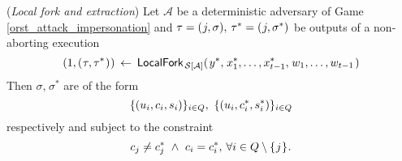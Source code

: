 \documentclass{iacrtrans}
\begin{document}
\begin{prop}\label{orst_extractability_prop}
\textup{(\textit{Local fork and extraction})}
Let $\mathcal{A}$ be a deterministic adversary of
Game \textup{\ref{orst_attack_impersonation}}
and
$\tau = (\hspace{0.5pt}j, \sigma),
\hspace{2pt}\tau^* = (\hspace{0.5pt}j, \sigma^*)$
be outputs of a non-aborting execution
\vspace{5pt}
\begin{equation*}
(
	\vspace{1pt}
	1,
	\vspace{1pt}
	(
		\hspace{0.5pt}
		\tau,
		\tau^*
		\hspace{0.5pt}
	)
	\hspace{0.5pt}
)
\hspace{2pt}
\leftarrow
\hspace{2pt}
\mathsf{LocalFork}_{
		\hspace{1pt}
    	\mathcal{S}\hspace{0pt}[
    		\hspace{0pt}
    		\mathcal{A}
    		\hspace{0pt}
    	]
    }
	(
   		\hspace{1pt}
		y ^*,
		\hspace{1pt}
		x_1^*, \dots, x_{t-1}^*,
		\hspace{1pt}
		w_1, \dots, w_{t-1}
		\hspace{1pt}
   	)
\vspace{5pt}
\end{equation*}
Then $\sigma,\hspace{1pt}\sigma^*$ are of the form
\vspace{5pt}
\begin{equation}\label{orst_forked_proofs}
\{(u_i, c_i, s_i)\}_{i \in Q},\ \{(u_i, c_i^*, s_i^*)\}_{i \in Q}
\vspace{5pt}
\end{equation}
respectively and subject to the constraint
\vspace{5pt}
\begin{equation}\label{orst_forked_challenges}
c_j \neq c_j^*
\ \land
\ c_i = c_i^*,\hspace{2pt}
\forall i \in Q \setminus \{\hspace{0.5pt}j\hspace{0.5pt}\}
\hspace{0.5pt}.
\vspace{5pt}

\end{equation}
\end{prop}
\end{document}
